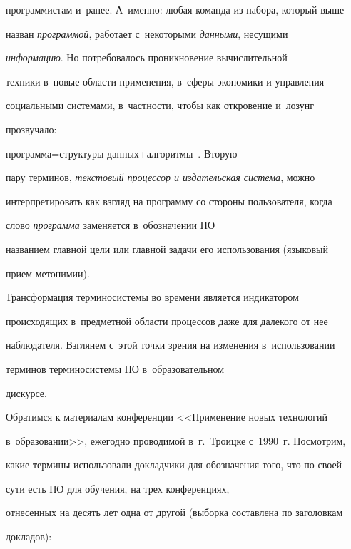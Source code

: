 программистам и~ранее. А~именно: любая команда из набора, который выше

назван \textit{программой}, работает с~некоторыми \textit{данными}, несущими

\textit{информацию}. Но потребовалось проникновение вычислительной

техники в~новые области применения, в~сферы экономики и управления

социальными системами, в~частности, чтобы как откровение и~лозунг

прозвучало:

  про\-грам\-ма\;=\;струк\-ту\-ры данных\;+\;алго\-рит\-мы~\cite{9-vik}. Вторую

пару терминов, \textit{тексто\-вый процессор и издательская система}, можно

интерпретировать как взгляд на программу со стороны пользователя, когда

слово \textit{программа} заменяется в~обозначении ПО

названием главной цели или главной задачи его использования (языковый

прием метонимии).



  Трансформация терминосистемы во времени является индикатором

происходящих в~предметной области процессов даже для далекого от нее

наблюдателя. Взглянем с~этой точки зрения на изменения в~использовании

терминов терминосистемы ПО в~образовательном

дискурсе.



  Обратимся к материалам конференции <<Применение новых технологий

в~образовании>>, ежегодно проводимой в~г.~Троицке с~1990~г. Посмотрим,

какие термины использовали докладчики для обозначения того, что по своей

сути есть ПО для обучения, на трех конференциях,

отнесенных на десять лет одна от другой (выборка составлена по заголовкам

докладов):



\noindent

